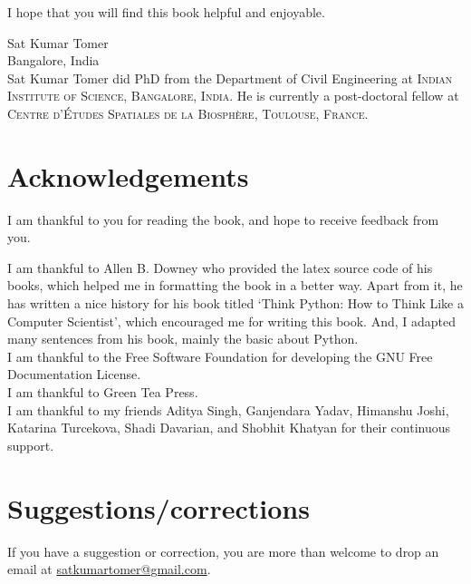 \documentclass[10pt]{book}
\begin{document}
I hope that you will find this book helpful and enjoyable. \\

\vfill


Sat Kumar Tomer \\
Bangalore, India\\

Sat Kumar Tomer did PhD from the Department of Civil Engineering at 
\textsc{Indian Institute of Science, Bangalore, India}. He is currently a post-doctoral fellow at \textsc{Centre d'Études Spatiales de la Biosphère, Toulouse, France}. 


\section*{Acknowledgements}

I am thankful to you for reading the book, and hope to receive feedback from you.

I am thankful to Allen B. Downey who provided the latex source code of his books, 
which helped me in formatting the book in a better way. Apart from it, 
he has written a nice history for his book titled `Think Python: How to Think Like
a Computer Scientist', which encouraged me for writing this book. 
And, I adapted many sentences from his book, mainly the basic about Python. \\

I am thankful to the Free Software Foundation for developing the 
GNU Free Documentation License. \\

I am thankful to Green Tea Press. \\

I am thankful to my friends Aditya Singh, Ganjendara Yadav, 
Himanshu Joshi, Katarina Turcekova, Shadi Davarian, and Shobhit Khatyan 
for their continuous support. \\

\section*{Suggestions/corrections}
If you have a suggestion or correction, you are more than 
welcome to drop an email at \url{satkumartomer@gmail.com}. \\


\normalsize

\clearemptydoublepage

\begin{latexonly}

\tableofcontents

\clearemptydoublepage

\end{latexonly}
\end{document}
